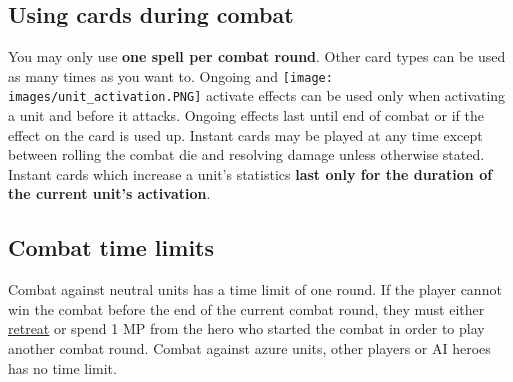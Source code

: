 \documentclass[12pt]{article}
\begin{document}
\subsection*{\hypertarget{CombatCards}{Using cards during combat}}
You may only use \textbf{one spell per combat round}. Other card types can be used as many times as you want to. Ongoing and \texttt{[image: images/unit\_activation.PNG]} activate effects can be used only when activating a unit and before it attacks. Ongoing effects last until end of combat or if the effect on the card is used up. Instant cards may be played at any time except between rolling the combat die and resolving damage unless otherwise stated. Instant cards which increase a unit's statistics \textbf{last only for the duration of the current unit's activation}.
\subsection*{\hypertarget{Timelimit}{Combat time limits}}
Combat against neutral units has a time limit of one round. If the player cannot win the combat
before the end of the current combat round, they must either \hyperlink{Endcombat}{retreat} or spend 1 MP from the hero who started the combat in order to play another combat round. Combat against azure units, other players or AI heroes has no time limit.
\clearpage
\end{document}
